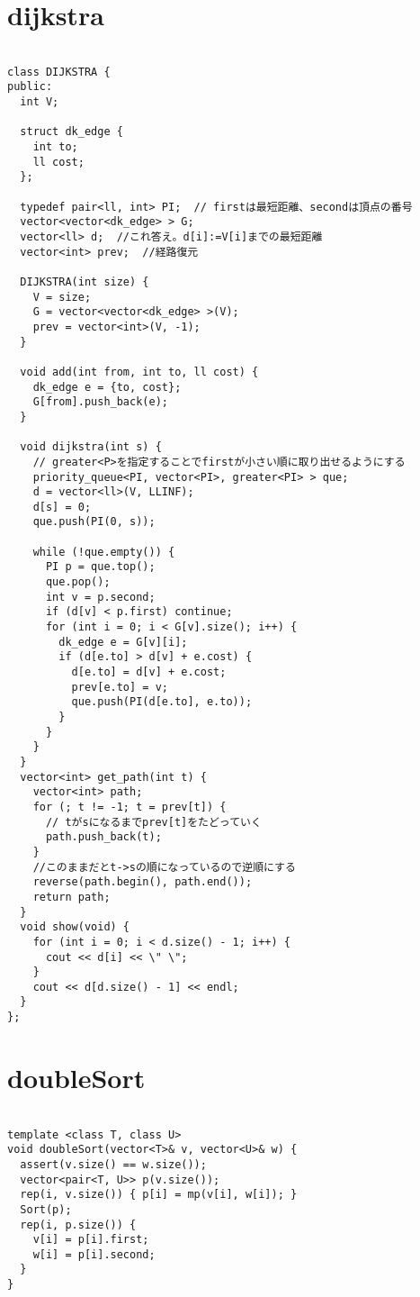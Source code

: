 \documentclass{jsarticle}
\begin{document}
\section{dijkstra}
\color{black}
\begin{lstlisting}[caption=dijkstra]

class DIJKSTRA {
public:
  int V;

  struct dk_edge {
    int to;
    ll cost;
  };

  typedef pair<ll, int> PI;  // firstは最短距離、secondは頂点の番号
  vector<vector<dk_edge> > G;
  vector<ll> d;  //これ答え。d[i]:=V[i]までの最短距離
  vector<int> prev;  //経路復元

  DIJKSTRA(int size) {
    V = size;
    G = vector<vector<dk_edge> >(V);
    prev = vector<int>(V, -1);
  }

  void add(int from, int to, ll cost) {
    dk_edge e = {to, cost};
    G[from].push_back(e);
  }

  void dijkstra(int s) {
    // greater<P>を指定することでfirstが小さい順に取り出せるようにする
    priority_queue<PI, vector<PI>, greater<PI> > que;
    d = vector<ll>(V, LLINF);
    d[s] = 0;
    que.push(PI(0, s));

    while (!que.empty()) {
      PI p = que.top();
      que.pop();
      int v = p.second;
      if (d[v] < p.first) continue;
      for (int i = 0; i < G[v].size(); i++) {
        dk_edge e = G[v][i];
        if (d[e.to] > d[v] + e.cost) {
          d[e.to] = d[v] + e.cost;
          prev[e.to] = v;
          que.push(PI(d[e.to], e.to));
        }
      }
    }
  }
  vector<int> get_path(int t) {
    vector<int> path;
    for (; t != -1; t = prev[t]) {
      // tがsになるまでprev[t]をたどっていく
      path.push_back(t);
    }
    //このままだとt->sの順になっているので逆順にする
    reverse(path.begin(), path.end());
    return path;
  }
  void show(void) {
    for (int i = 0; i < d.size() - 1; i++) {
      cout << d[i] << \" \";
    }
    cout << d[d.size() - 1] << endl;
  }
};

\end{lstlisting}

\color{white}
\section{doubleSort}
\color{black}
\begin{lstlisting}[caption=doubleSort]

template <class T, class U>
void doubleSort(vector<T>& v, vector<U>& w) {
  assert(v.size() == w.size());
  vector<pair<T, U>> p(v.size());
  rep(i, v.size()) { p[i] = mp(v[i], w[i]); }
  Sort(p);
  rep(i, p.size()) {
    v[i] = p[i].first;
    w[i] = p[i].second;
  }
}

\end{lstlisting}
\end{document}
